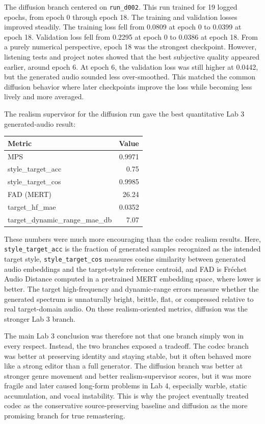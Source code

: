 \documentclass[11pt]{article}
\begin{document}
The diffusion branch centered on \texttt{run\_d002}. This run trained for 19 logged epochs, from epoch 0 through epoch 18. The training and validation losses improved steadily. The training loss fell from 0.0809 at epoch 0 to 0.0399 at epoch 18. Validation loss fell from 0.2295 at epoch 0 to 0.0386 at epoch 18. From a purely numerical perspective, epoch 18 was the strongest checkpoint. However, listening tests and project notes showed that the best subjective quality appeared earlier, around epoch 6. At epoch 6, the validation loss was still higher at 0.0442, but the generated audio sounded less over-smoothed. This matched the common diffusion behavior where later checkpoints improve the loss while becoming less lively and more averaged.

The realism supervisor for the diffusion run gave the best quantitative Lab 3 generated-audio result:
\begin{center}
\begin{tabular}{>{\raggedright\arraybackslash}p{2.0in}r}
\toprule
Metric & Value \\
\midrule
MPS & 0.9971 \\
style\_target\_acc & 0.75 \\
style\_target\_cos & 0.9985 \\
FAD (MERT) & 26.24 \\
target\_hf\_mae & 0.0352 \\
target\_dynamic\_range\_mae\_db & 7.07 \\
\bottomrule
\end{tabular}
\end{center}

These numbers were much more encouraging than the codec realism results. Here, \texttt{style\_target\_acc} is the fraction of generated samples recognized as the intended target style, \texttt{style\_target\_cos} measures cosine similarity between generated audio embeddings and the target-style reference centroid, and FAD is Fr\'echet Audio Distance computed in a pretrained MERT embedding space, where lower is better. The target high-frequency and dynamic-range errors measure whether the generated spectrum is unnaturally bright, brittle, flat, or compressed relative to real target-domain audio. On these realism-oriented metrics, diffusion was the stronger Lab 3 branch.

The main Lab 3 conclusion was therefore not that one branch simply won in every respect. Instead, the two branches exposed a tradeoff. The codec branch was better at preserving identity and staying stable, but it often behaved more like a strong editor than a full generator. The diffusion branch was better at stronger genre movement and better realism-supervisor scores, but it was more fragile and later caused long-form problems in Lab 4, especially warble, static accumulation, and vocal instability. This is why the project eventually treated codec as the conservative source-preserving baseline and diffusion as the more promising branch for true remastering.
\end{document}
